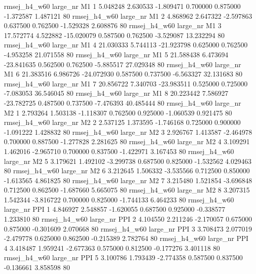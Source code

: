 rmsej_h4_w60   large_nr       M1                 1  5.048248  2.630533  -1.809471 0.700000 0.875000 -1.372587    1.487121 80
rmsej_h4_w60   large_nr       M1                 2  4.868962  2.647322  -2.597863 0.637500 0.762500 -1.529328    2.608876 80
rmsej_h4_w60   large_nr       M1                 3 17.572774  4.522882 -15.020079 0.587500 0.762500 -3.529087   13.232294 80
rmsej_h4_w60   large_nr       M1                 4 21.030333  5.744113 -21.923798 0.625000 0.762500 -4.953258   21.071558 80
rmsej_h4_w60   large_nr       M1                 5 21.588438  6.473694 -23.841635 0.562500 0.762500 -5.885517   27.029348 80
rmsej_h4_w60   large_nr       M1                 6 21.383516  6.986726 -24.072930 0.587500 0.737500 -6.563327   32.131683 80
rmsej_h4_w60   large_nr       M1                 7 20.856722  7.340703 -23.983511 0.525000 0.725000 -7.083053   36.546045 80
rmsej_h4_w60   large_nr       M1                 8 20.223442  7.586927 -23.782725 0.487500 0.737500 -7.476393   40.485444 80
rmsej_h4_w60   large_nr       M2                 1  2.793264  1.503138  -1.118307 0.762500 0.925000 -1.060539    0.921475 80
rmsej_h4_w60   large_nr       M2                 2  2.537125  1.373595  -1.746168 0.725000 0.900000 -1.091222    1.428832 80
rmsej_h4_w60   large_nr       M2                 3  2.926767  1.413587  -2.464978 0.700000 0.887500 -1.277828    2.281625 80
rmsej_h4_w60   large_nr       M2                 4  3.109291  1.462016  -2.965710 0.700000 0.837500 -1.422971    3.167453 80
rmsej_h4_w60   large_nr       M2                 5  3.179621  1.492102  -3.299738 0.687500 0.825000 -1.532562    4.029463 80
rmsej_h4_w60   large_nr       M2                 6  3.212645  1.506332  -3.535566 0.712500 0.850000 -1.613565    4.861825 80
rmsej_h4_w60   large_nr       M2                 7  3.215480  1.521854  -3.696848 0.712500 0.862500 -1.687660    5.665075 80
rmsej_h4_w60   large_nr       M2                 8  3.207315  1.542344  -3.816722 0.700000 0.825000 -1.744133    6.464233 80
rmsej_h4_w60   large_nr      PPI                 1  4.846927  2.548857  -1.620055 0.687500 0.925000 -0.338577    1.233810 80
rmsej_h4_w60   large_nr      PPI                 2  4.104550  2.211246  -2.170057 0.675000 0.875000 -0.301609    2.070668 80
rmsej_h4_w60   large_nr      PPI                 3  3.708473  2.077019  -2.479778 0.625000 0.862500 -0.215389    2.782764 80
rmsej_h4_w60   large_nr      PPI                 4  3.418487  1.959241  -2.677363 0.575000 0.812500 -0.177276    3.401118 80
rmsej_h4_w60   large_nr      PPI                 5  3.100786  1.793439  -2.774358 0.587500 0.837500 -0.136661    3.858598 80
